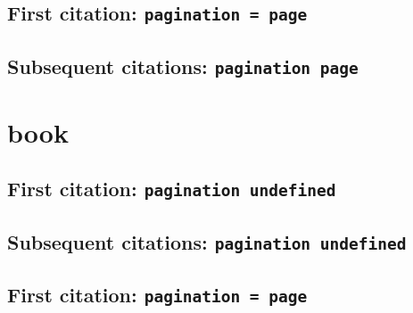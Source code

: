 \documentclass[a4paper]{article}
\begin{document}
\cite{wellhausen:1876-1877}

\cite[161]{wellhausen:1876-1877}

\cite[note]{wellhausen:1876-1877}

\subsection{First citation: \texttt{pagination = page}}

\cite{wellhausen:1876-1877:a}

\citereset
\cite[161]{wellhausen:1876-1877:a}

\citereset
\cite[note]{wellhausen:1876-1877:a}

\subsection{Subsequent citations: \texttt{pagination page}}

\cite{wellhausen:1876-1877:a}

\cite[161]{wellhausen:1876-1877:a}

\cite[note]{wellhausen:1876-1877:a}

\section{book}

\subsection{First citation: \texttt{pagination undefined}}

\cite{talbert:1992}

\citereset
\cite[4]{talbert:1992}

\citereset
\cite[note]{talbert:1992}

\subsection{Subsequent citations: \texttt{pagination undefined}}

\cite{talbert:1992}

\cite[4]{talbert:1992}

\cite[note]{talbert:1992}

\subsection{First citation: \texttt{pagination = page}}
\end{document}
